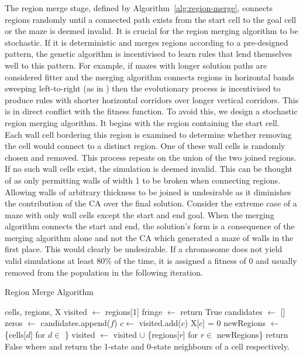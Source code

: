 The region merge stage, defined by Algorithm~\ref{alg:region-merge}, connects regions randomly until a connected path exists from the start cell to the goal cell or the maze is deemed invalid. It is crucial for the region merging algorithm to be stochastic. If it is deterministic and merges regions according to a pre-designed pattern, the genetic algorithm is incentivised to learn rules that lend themselves well to this pattern. For example, if mazes with longer solution paths are considered fitter and the merging algorithm connects regions in horizontal bands sweeping left-to-right (as in \cite{adams2018evolving}) then the evolutionary process is incentivised to produce rules with shorter horizontal corridors over longer vertical corridors. This is in direct conflict with the fitness function. To avoid this, we design a stochastic region merging algorithm. It begins with the region containing the start cell. Each wall cell bordering this region is examined to determine whether removing the cell would connect to a distinct region. One of these wall cells is randomly chosen and removed. This process repeats on the union of the two joined regions. If no such wall cells exist, the simulation is deemed invalid. This can be thought of as only permitting walls of width 1 to be broken when connecting regions. Allowing walls of arbitrary thickness to be joined is undesirable as it diminishes the contribution of the CA over the final solution. Consider the extreme case of a maze with only wall cells except the start and end goal. When the merging algorithm connects the start and end, the solution's form is a consequence of the merging algorithm alone and not the CA which generated a maze of walls in the first place. This would clearly be undesirable. If a chromosome does not yield valid simulations at least 80\% of the time, it is assigned a fitness of 0 and usually removed from the population in the following iteration.\\

\begin{algorithm}
  \caption{Region Merge Algorithm}\label{alg:region-merge}
  \begin{algorithmic}
  \Require cells, regions, X
  \State visited $\gets$ regions[1]
    \State fringe $\gets$ 
        \State return True 
    \EndIf
    \State candidates $\gets$ []
        \State zeros $\gets$ 
            \State candidates.append($f$)
        \EndIf
    \EndFor
        \State $c \gets$ 
        \State visited.add($c$)
        \State X[$c$] = 0
        \State newRegions $\gets$ \{cells[$d$] for $d \in$ \}
        \State visited $\gets$ visited $\cup$ \{regions[$r$] for $r \in$ newRegions\}
    \Else
        \State return False 
    \EndIf
  \EndWhile
  \State
  \State where  and  return the 1-state and 0-state neighbours of a cell respectively.
  \end{algorithmic}
\end{algorithm}

